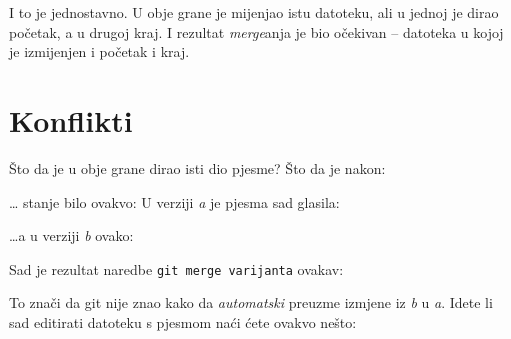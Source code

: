 I to je jednostavno.
U obje grane je mijenjao istu datoteku, ali u jednoj je dirao početak, a u drugoj kraj.
I rezultat \emph{merge}anja je bio očekivan -- datoteka u kojoj je izmijenjen i početak i kraj.

\section*{Konflikti}

Što da je u obje grane dirao isti dio pjesme?
Što da je nakon:



\dots{} stanje bilo ovakvo:
U verziji \emph a je pjesma sad glasila:


\dots{}a u verziji \emph b ovako:


Sad je rezultat naredbe \verb+git merge varijanta+ ovakav:



To znači da git nije znao kako da \emph{automatski} preuzme izmjene iz \emph b u \emph a.
Idete li sad editirati datoteku s pjesmom naći ćete ovakvo nešto:

